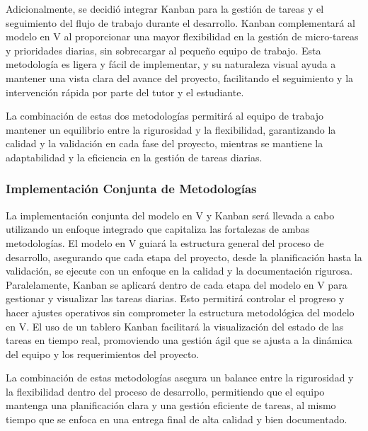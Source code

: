 \documentclass[main.tex]{subfiles}
\begin{document}
Adicionalmente, se decidió integrar Kanban para la gestión de tareas y el seguimiento del flujo de trabajo durante el desarrollo. Kanban complementará al modelo en V al proporcionar una mayor flexibilidad en la gestión de micro-tareas y prioridades diarias, sin sobrecargar al pequeño equipo de trabajo. Esta metodología es ligera y fácil de implementar, y su naturaleza visual ayuda a mantener una vista clara del avance del proyecto, facilitando el seguimiento y la intervención rápida por parte del tutor y el estudiante.

La combinación de estas dos metodologías permitirá al equipo de trabajo mantener un equilibrio entre la rigurosidad y la flexibilidad, garantizando la calidad y la validación en cada fase del proyecto, mientras se mantiene la adaptabilidad y la eficiencia en la gestión de tareas diarias.

\subsubsection{Implementación Conjunta de Metodologías}

La implementación conjunta del modelo en V y Kanban será llevada a cabo utilizando un enfoque integrado que capitaliza las fortalezas de ambas metodologías. El modelo en V guiará la estructura general del proceso de desarrollo, asegurando que cada etapa del proyecto, desde la planificación hasta la validación, se ejecute con un enfoque en la calidad y la documentación rigurosa. Paralelamente, Kanban se aplicará dentro de cada etapa del modelo en V para gestionar y visualizar las tareas diarias. Esto permitirá controlar el progreso y hacer ajustes operativos sin comprometer la estructura metodológica del modelo en V. El uso de un tablero Kanban facilitará la visualización del estado de las tareas en tiempo real, promoviendo una gestión ágil que se ajusta a la dinámica del equipo y los requerimientos del proyecto.

La combinación de estas metodologías asegura un balance entre la rigurosidad y la flexibilidad dentro del proceso de desarrollo, permitiendo que el equipo mantenga una planificación clara y una gestión eficiente de tareas, al mismo tiempo que se enfoca en una entrega final de alta calidad y bien documentado.
\end{document}
